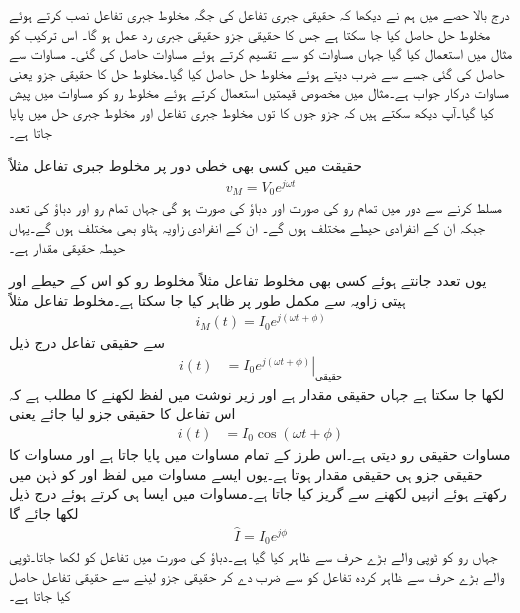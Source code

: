 درج بالا حصے میں ہم نے دیکھا کہ حقیقی جبری تفاعل کی جگہ مخلوط جبری تفاعل نصب کرتے ہوئے مخلوط حل حاصل کیا جا سکتا ہے جس کا حقیقی جزو حقیقی جبری رد عمل ہو گا۔ اس ترکیب کو مثال  میں استعمال کیا گیا جہاں مساوات  کو  سے تقسیم کرتے ہوئے مساوات  حاصل کی گئی۔ مساوات  سے  حاصل کی گئی جسے   سے ضرب دیتے ہوئے مخلوط حل حاصل کیا گیا۔مخلوط حل کا حقیقی جزو یعنی مساوات  درکار جواب ہے۔مثال  میں  مخصوص قیمتیں استعمال کرتے  ہوئے مخلوط رو کو مساوات   میں پیش کیا گیا۔آپ دیکھ سکتے ہیں کہ جزو   جوں کا توں مخلوط جبری تفاعل اور مخلوط جبری حل میں پایا جاتا ہے۔

حقیقت میں کسی بھی خطی دور پر مخلوط جبری تفاعل مثلاً
\begin{align}
v_M=V_0 e^{j \omega t}
\end{align}
مسلط کرنے سے دور میں تمام رو کی صورت  اور دباؤ کی صورت  ہو گی جہاں تمام رو اور دباؤ  کی تعدد  جبکہ ان کے انفرادی  حیطے مختلف ہوں گے۔ ان کے انفرادی زاویہ ہٹاو بھی مختلف ہوں گے۔یہاں حیطہ حقیقی مقدار ہے۔

یوں تعدد جانتے ہوئے کسی بھی مخلوط تفاعل مثلاً مخلوط رو کو اس کے حیطے  اور ہیتی زاویہ  سے مکمل طور پر ظاہر کیا جا سکتا ہے۔مخلوط تفاعل مثلاً 
\begin{align}
i_M(t)=I_0 e^{j(\omega t+\phi)}
\end{align}
سے حقیقی تفاعل درج ذیل
\begin{align}\label{مساوات_بدلتا_حقیقی_رو_الف}
i(t)&=\left. I_0 e^{j(\omega t+\phi)} \right|_{\text{حقیقی}}
\end{align}
لکھا جا سکتا ہے جہاں  حقیقی مقدار ہے اور زیر نوشت میں لفظ  لکھنے کا مطلب ہے کہ اس تفاعل کا حقیقی جزو لیا جائے یعنی
\begin{align}\label{مساوات_بدلتا_حقیقی_رو_ب}
i(t)&=I_0 \cos (\omega t+\phi)
\end{align}
مساوات  حقیقی رو دیتی ہے۔اس طرز کے تمام مساوات میں  پایا جاتا ہے اور مساوات کا حقیقی جزو ہی حقیقی مقدار ہوتا ہے۔یوں ایسے مساوات میں لفظ  اور  کو ذہن میں رکھتے ہوئے انہیں لکھنے سے گریز کیا جاتا ہے۔مساوات  میں ایسا ہی کرتے ہوئے درج ذیل لکھا جائے گا
\begin{align}\label{مساوات_بدلتا_دوری_سمتیہ_الف}
\hat{I}=I_0e^{j\phi}
\end{align}
جہاں رو کو ٹوپی والے بڑے حرف سے ظاہر کیا گیا ہے۔دباؤ کی صورت میں تفاعل کو  لکھا جاتا۔ٹوپی والے بڑے حرف سے ظاہر کردہ تفاعل کو  سے ضرب دے کر حقیقی جزو لینے سے حقیقی تفاعل حاصل کیا جاتا ہے۔

